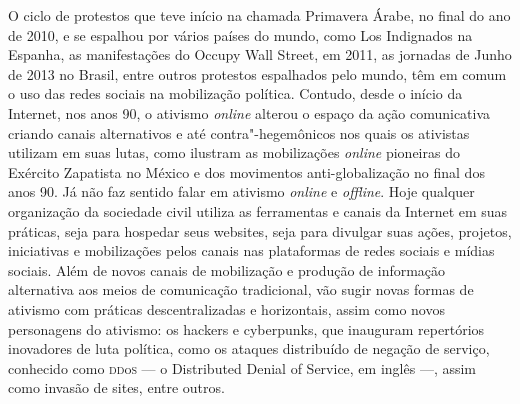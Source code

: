 
O ciclo de protestos que teve início na chamada Primavera Árabe, no
final do ano de 2010, e se espalhou por vários países do mundo, como Los
Indignados na Espanha, as manifestações do Occupy Wall Street, em 2011,
as jornadas de Junho de 2013 no Brasil, entre outros protestos
espalhados pelo mundo, têm em comum o uso das redes sociais na
mobilização política. Contudo, desde o início da Internet, nos anos 90,
o ativismo \emph{online} alterou o espaço da ação comunicativa criando canais
alternativos e até contra"-hegemônicos nos quais os ativistas utilizam em
suas lutas, como ilustram as mobilizações \emph{online} pioneiras do Exército
Zapatista no México e dos movimentos anti-globalização no final dos
anos 90. Já não faz sentido falar em ativismo \emph{online} e \emph{offline}. Hoje
qualquer organização da sociedade civil utiliza as ferramentas e canais
da Internet em suas práticas, seja para hospedar seus websites, seja
para divulgar suas ações, projetos, iniciativas e mobilizações pelos
canais nas plataformas de redes sociais e mídias sociais. Além de novos
canais de mobilização e produção de informação alternativa aos meios de
comunicação tradicional, vão sugir novas formas de ativismo com práticas
descentralizadas e horizontais, assim como novos personagens do
ativismo: os hackers e cyberpunks, que inauguram repertórios inovadores
de luta política, como os ataques distribuído de negação de serviço,
conhecido como \textsc{dd}o\textsc{s} --- o Distributed Denial of Service, em inglês ---, assim
como invasão de sites, entre outros.

